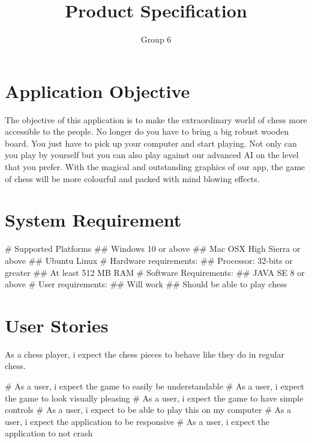 \documentclass{article}
\begin{document}
\title{Product Specification}
\author{Group 6}
\maketitle

\section*{Application Objective}
The objective of this application is to make the extraordinary world of chess more accessible
to the people. No longer do you have to bring a big robust wooden board. You just have to
pick up your computer and start playing. Not only can you play by yourself but you can also play
against our advanced AI on the level that you prefer. With the magical and outstanding graphics
of our app, the game of chess will be more colourful and packed with mind blowing effects.

\section*{System Requirement}
\begin{easylist}[itemize]
# Supported Platforms 
## Windows 10 or above
## Mac OSX High Sierra or above
## Ubuntu Linux
# Hardware requirements:
## Processor: 32-bits or greater
## At least 512 MB RAM
# Software Requirements:
## JAVA SE 8 or above
# User requirements:
## Will work
## Should be able to play chess
\end{easylist}
\section*{User Stories}
As a chess player, i expect the chess pieces to behave like they do in regular chess.

\begin{easylist}[itemize]
# As a user, i expect the game to easily be understandable
# As a user, i expect the game to look visually pleasing
# As a user, i expect the game to have simple controls
# As a user, i expect to be able to play this on my computer
# As a user, i expect the application to be responsive
# As a user, i expect the application to not crash
\end{easylist}
\end{document}
